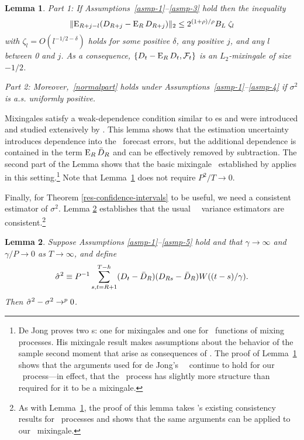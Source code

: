 \documentclass[11pt]{article}
\newtheorem{lem}{Lemma}
\newcommand{\citepos}[1]{\citeauthor{#1}'s \citeyearpar{#1}}
\begin{document}
\begin{lem}\label{res-mixingale}
  Part 1: If Assumptions~\ref{asmp-1}--\ref{asmp-3} hold then the
  inequality
  \begin{equation}\label{mixingaleR}
    \lVert \operatorname{E}_{R+j-l}(D_{R+j} - \operatorname{E}_R D_{R+j}) \rVert_2 \leq
    2^{(1+\rho)/\rho} B_L \; \zeta_l
  \end{equation}
  with $\zeta_l = O(l^{-1/2 - \delta})$ holds for some positive
  $\delta$, any positive $j$, and any $l$ between 0 and $j$.  As a
  consequence, $\{D_t - \operatorname{E}_R D_t, \mathcal F_t\}$ is an
  $L_2$-mixingale of size $-1/2$.

  \noindent Part 2: Moreover,~\eqref{normalpart} holds under
  Assumptions~\ref{asmp-1}--\ref{asmp-4} if $\sigma^2$ is
  a.s. uniformly positive.
\end{lem}

Mixingales satisfy a weak-dependence condition similar to \mds es and
were introduced and studied extensively by
\citet{Mcl:74,Mcl:75,Mcl:75b,Mcl:77}.  This lemma shows that the
estimation uncertainty introduces dependence into the \oos\ forecast
errors, but the additional dependence is contained in the term $\operatorname{E}_R
\bar{D}_{R}$ and can be effectively removed by subtraction.  The second part
of the Lemma shows that the basic mixingale \clt\ established by
\citet{Jon:97} applies in this setting.\footnote{De Jong proves two
  \clt s: one for mixingales and one for \ned\ functions of mixing
  processes.  His mixingale result makes assumptions about the
  behavior of the sample second moment that arise as consequences of
  \ned.  The proof of Lemma~\ref{res-mixingale} shows that the
  arguments used for de Jong's \ned\ \clt\ continue to hold for our
  \oos\ process---in effect, that the \oos\ process has slightly more
  structure than required for it to be a mixingale.}  Note that
Lemma~\ref{res-mixingale} does not require $P^2/T \to 0$.

Finally, for Theorem \ref{res-confidence-intervals} to be useful, we
need a consistent estimator of $\sigma^2$. Lemma
\ref{res-variance-estimator} establishes that the usual \oos\ \hac\
variance estimators are consistent.\footnote{As with
      Lemma~\ref{res-mixingale}, the proof of this lemma takes
      \citepos{JoD:00} existing consistency results
      for \ned\ processes and shows that the same arguments can be
      applied to our \oos\ mixingale.}

\begin{lem}
  \label{res-variance-estimator} Suppose Assumptions
  \ref{asmp-1}--\ref{asmp-5} hold and that $\gamma \to \infty$ and
  $\gamma/P \to 0$ as $T \to \infty$, and define
  \begin{equation*}
    \hat{\sigma}^2 \equiv P^{-1} \sum_{s,t=R+1}^{T-h} (D_t - \bar{D}_{R})(D_{Rs} - \bar{D}_{R})
    W((t-s)/\gamma).
  \end{equation*}
  Then $\hat{\sigma}^2 - \sigma^2 \to^p 0$.
\end{lem}
\end{document}
